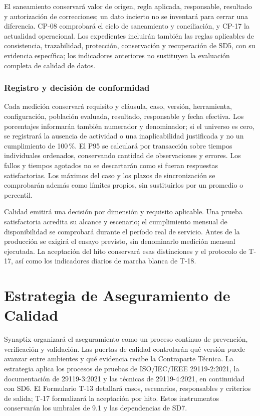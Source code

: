 El saneamiento conservará valor de origen, regla aplicada, responsable, resultado y autorización de correcciones; un dato incierto no se inventará para cerrar una diferencia. CP-08 comprobará el ciclo de saneamiento y conciliación, y CP-17 la actualidad operacional. Los expedientes incluirán también las reglas aplicables de consistencia, trazabilidad, protección, conservación y recuperación de SD5, con su evidencia específica; los indicadores anteriores no sustituyen la evaluación completa de calidad de datos.

\subsubsection{Registro y decisión de conformidad}
Cada medición conservará requisito y cláusula, caso, versión, herramienta, configuración, población evaluada, resultado, responsable y fecha efectiva. Los porcentajes informarán también numerador y denominador; si el universo es cero, se registrará la ausencia de actividad o una inaplicabilidad justificada y no un cumplimiento de 100\,\%. El P95 se calculará por transacción sobre tiempos individuales ordenados, conservando cantidad de observaciones y errores. Los fallos y tiempos agotados no se descartarán como si fueran respuestas satisfactorias. Los máximos del caso y los plazos de sincronización se comprobarán además como límites propios, sin sustituirlos por un promedio o percentil.

Calidad emitirá una decisión por dimensión y requisito aplicable. Una prueba satisfactoria acredita su alcance y escenario; el cumplimiento mensual de disponibilidad se comprobará durante el período real de servicio. Antes de la producción se exigirá el ensayo previsto, sin denominarlo medición mensual ejecutada. La aceptación del hito conservará esas distinciones y el protocolo de T-17, así como los indicadores diarios de marcha blanca de T-18.

\section{Estrategia de Aseguramiento de Calidad}
Synaptix organizará el aseguramiento como un proceso continuo de prevención, verificación y validación. Las puertas de calidad controlarán qué versión puede avanzar entre ambientes y qué evidencia recibe la Contraparte Técnica. La estrategia aplica los procesos de pruebas de ISO/IEC/IEEE 29119-2:2021, la documentación de 29119-3:2021 y las técnicas de 29119-4:2021, en continuidad con SD6. El Formulario T-13 detallará casos, escenarios, responsables y criterios de salida; T-17 formalizará la aceptación por hito. Estos instrumentos conservarán los umbrales de 9.1 y las dependencias de SD7. \parencites{sd9-29119-2,sd9-29119-3,sd9-29119-4}[sec.~6.2]{sd9-sd6}

